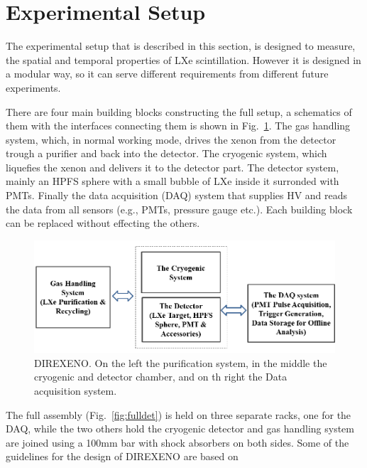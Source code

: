 \section{Experimental Setup}
\label{expSetup}

The experimental setup that is described in this section, is designed to measure, the spatial and 
temporal properties of LXe scintillation. However it is designed in a modular way, so it can serve different 
requirements from different future experiments. 

There are four main building blocks constructing the full setup, a schematics of them with the interfaces 
connecting them is shown in Fig.~\ref{fig:fullschematics}. The gas handling system, which, in normal working mode, 
drives the xenon from the detector trough a purifier and back into the detector. The cryogenic system, which liquefies 
the xenon and delivers it to the detector part. The detector system, mainly an HPFS sphere with a small bubble of LXe 
inside it surronded with PMTs. Finally the data acquisition (DAQ) system that supplies HV and reads the data from all 
sensors (e.g., PMTs, pressure gauge etc.). Each building block can be replaced without effecting the others. 

\begin{figure}[t!]
\centerline{\includegraphics[width=1.\linewidth]{WholeSys.png}}
\caption{DIREXENO. On the left the purification system, in the middle the cryogenic and detector chamber, and on th right the Data acquisition system.}
\label{fig:fullschematics}
\end{figure}

The full assembly (Fig.~\ref{fig:fulldet}) is held on three separate racks, one for the DAQ, while the two others hold 
the cryogenic detector and gas handling system are joined using a 100mm bar with shock absorbers on both sides. Some of 
the guidelines for the design of DIREXENO are based on~\cite{Giboni}  

